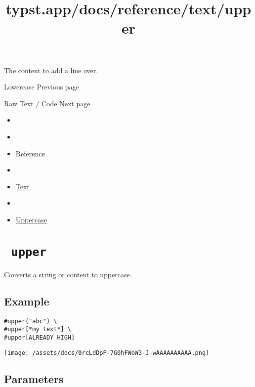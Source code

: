 The content to add a line over.

\href{/docs/reference/text/lower/}{\pandocbounded{}}

{ Lowercase } { Previous page }

\href{/docs/reference/text/raw/}{\pandocbounded{}}

{ Raw Text / Code } { Next page }


\title{typst.app/docs/reference/text/upper}

\begin{itemize}
\tightlist
\item
  \href{/docs}{}
\item
  
\item
  \href{/docs/reference/}{Reference}
\item
  
\item
  \href{/docs/reference/text/}{Text}
\item
  
\item
  \href{/docs/reference/text/upper/}{Uppercase}
\end{itemize}

\section{\texorpdfstring{\texttt{\ upper\ }}{ upper }}\label{summary}

Converts a string or content to uppercase.

\subsection{Example}\label{example}

\begin{verbatim}
#upper("abc") \
#upper[*my text*] \
#upper[ALREADY HIGH]
\end{verbatim}

\texttt{[image: /assets/docs/0rcLdDpP-7G0hFWoW3-J-wAAAAAAAAAA.png]}

\subsection{\texorpdfstring{{ Parameters
}}{ Parameters }}\label{parameters}


